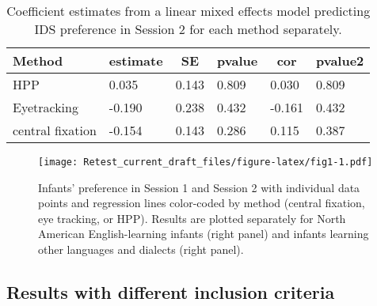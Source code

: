 \documentclass[
  english,
  man,floatsintext]{apa6}
\begin{document}
\begin{table}[tbp]

\begin{center}
\begin{threeparttable}

\caption{\label{tab:unnamed-chunk-5}Coefficient estimates from a linear mixed effects model predicting IDS preference in Session 2 for each method separately.}

\begin{tabular}{llllll}
\toprule
Method & \multicolumn{1}{c}{estimate} & \multicolumn{1}{c}{SE} & \multicolumn{1}{c}{pvalue} & \multicolumn{1}{c}{cor} & \multicolumn{1}{c}{pvalue2}\\
\midrule
HPP & 0.035 & 0.143 & 0.809 & 0.030 & 0.809\\
Eyetracking & -0.190 & 0.238 & 0.432 & -0.161 & 0.432\\
central fixation & -0.154 & 0.143 & 0.286 & 0.115 & 0.387\\
\bottomrule
\end{tabular}

\end{threeparttable}
\end{center}

\end{table}

\begin{figure}
\centering
\texttt{[image: Retest\_current\_draft\_files/figure-latex/fig1-1.pdf]}
\caption{\label{fig:fig1}Infants' preference in Session 1 and Session 2 with individual data points and regression lines color-coded by method (central fixation, eye tracking, or HPP). Results are plotted separately for North American English-learning infants (right panel) and infants learning other languages and dialects (right panel).}
\end{figure}

\hypertarget{results-with-different-inclusion-criteria}{%
\subsection{Results with different inclusion criteria}\label{results-with-different-inclusion-criteria}}
\end{document}
